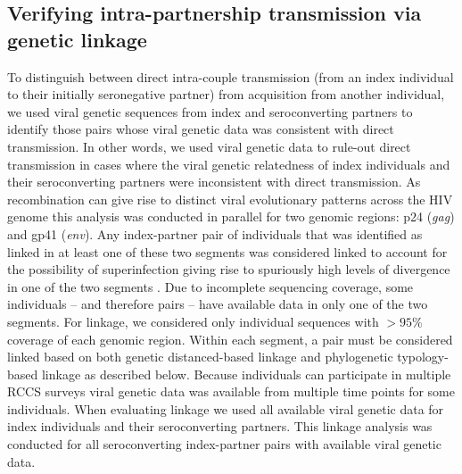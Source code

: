 \documentclass{article}[11pt]
\begin{document}
\subsection*{Verifying intra-partnership transmission via genetic linkage}
To distinguish between direct intra-couple transmission (from an index individual to their initially seronegative partner) from acquisition from another individual, we used viral genetic sequences from index and seroconverting partners to identify those pairs whose viral genetic data was consistent with direct transmission. In other words, we used viral genetic data to rule-out direct transmission in cases where the viral genetic relatedness of index individuals and their seroconverting partners were inconsistent with direct transmission. As recombination can give rise to distinct viral evolutionary patterns across the HIV genome this analysis was conducted in parallel for two genomic regions: p24 (\textit{gag}) and gp41 (\textit{env}). Any index-partner pair of individuals that was identified as linked in at least one of these two segments was considered linked to account for the possibility of superinfection giving rise to spuriously high levels of divergence in one of the two segments . Due to incomplete sequencing coverage, some individuals -- and therefore pairs -- have available data in only one of the two segments. For linkage, we considered only individual sequences with $>95\%$ coverage of each genomic region. Within each segment, a pair must be considered linked based on both genetic distanced-based linkage and phylogenetic typology-based linkage as described below. Because individuals can participate in multiple RCCS surveys viral genetic data was available from multiple time points for some individuals. When evaluating linkage we used all available viral genetic data for index individuals and their seroconverting partners. This linkage analysis was conducted for all seroconverting index-partner pairs with available viral genetic data. 
\end{document}
